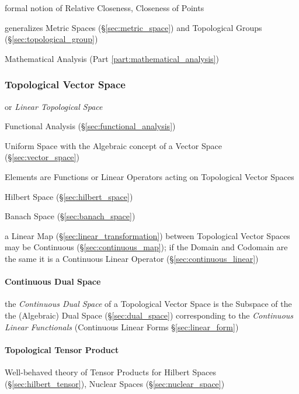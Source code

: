 formal notion of Relative Closeness, Closeness of Points

generalizes Metric Spaces (\S\ref{sec:metric_space}) and Topological
Groups (\S\ref{sec:topological_group})

Mathematical Analysis (Part \ref{part:mathematical_analysis})



\subsubsection{Topological Vector Space}\label{sec:topological_vectorspace}

or \emph{Linear Topological Space}

Functional Analysis (\S\ref{sec:functional_analysis})

Uniform Space with the Algebraic concept of a Vector Space
(\S\ref{sec:vector_space})

Elements are Functions or Linear Operators acting on Topological
Vector Spaces

Hilbert Space (\S\ref{sec:hilbert_space})

Banach Space (\S\ref{sec:banach_space})

a Linear Map (\S\ref{sec:linear_transformation}) between Topological Vector
Spaces may be Continuous (\S\ref{sec:continuous_map}); if the Domain
and Codomain are the same it is a Continuous Linear Operator
(\S\ref{sec:continuous_linear})



\paragraph{Continuous Dual Space}\label{sec:continuous_dual_space}
\hfill

the \emph{Continuous Dual Space} of a Topological Vector Space is the Subspace
of the the (Algebraic) Dual Space (\S\ref{sec:dual_space}) corresponding to the
\emph{Continuous Linear Functionals} (Continuous Linear Forms
\S\ref{sec:linear_form})



\paragraph{Topological Tensor Product}\label{sec:topological_tensor}
\hfill

Well-behaved theory of Tensor Products for Hilbert Spaces
(\S\ref{sec:hilbert_tensor}), Nuclear Spaces
(\S\ref{sec:nuclear_space})



